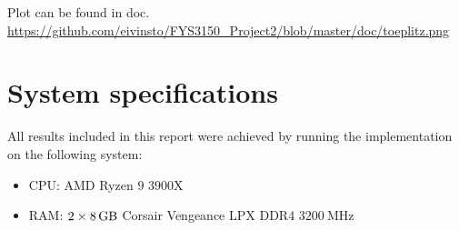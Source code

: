 \documentclass[reprint,english,notitlepage]{revtex4-1}  %
\begin{document}
Plot can be found in doc.
\url{https://github.com/eivinsto/FYS3150_Project2/blob/master/doc/toeplitz.png}

\section{System specifications} \label{C}
All results included in this report were achieved by running the implementation on the following system:
\begin{itemize}
	\item CPU: AMD Ryzen \(9\) \(3900\)X
	\item RAM: \(2\times\SI{8}{\giga\byte}\) Corsair Vengeance LPX DDR\(4\) \(\SI{3200}{\mega\hertz}\)
\end{itemize}
\end{document}
